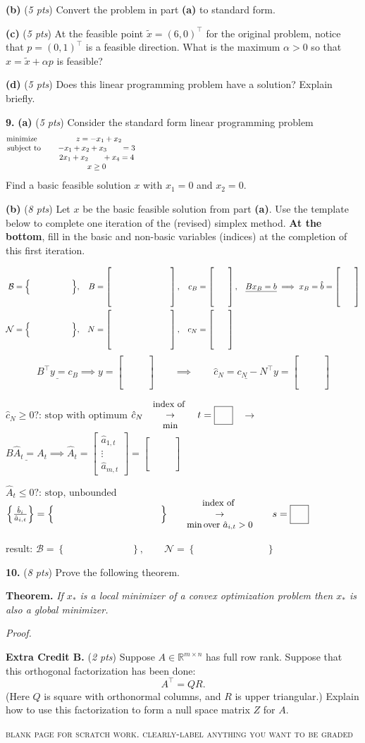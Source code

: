 \documentclass[11pt]{amsart}
\newcommand{\RR}{{\mathbb{R}}}
\newcommand{\prob}[1]{\bigskip\noindent\textbf{#1.} }
\newcommand{\pts}[1]{(\emph{#1 pts})}
\newcommand{\probpts}[2]{\prob{#1} \pts{#2}}
\newcommand{\ppartpts}[2]{\textbf{(#1)} \pts{#2}}
\newcommand{\epartpts}[2]{\medskip\noindent \textbf{(#1)} \pts{#2}}
\newcommand{\blankset}{\Big\{\hspace{0.7in}\Big\}}
\newcommand{\blankmatrix}{\begin{bmatrix} \hspace{1.0in} \\ \hspace{1.0in} \\ \hspace{1.0in} \\ \hspace{1.0in} \end{bmatrix}}
\newcommand{\blankcolumn}{\begin{bmatrix} \phantom{mm} \\ \phantom{m} \\ \phantom{m} \\ \phantom{m} \end{bmatrix}}
\newcommand{\boxint}{\boxed{\phantom{m\big|}}}
\newcommand{\longblankset}{\Big\{\hspace{1.5in}\Big\}}
\newcommand{\stacksarrow}[2]{\quad {\small \begin{matrix} #1 \\ \to \\ #2 \end{matrix}} \quad}
\newcommand{\lpstep}{%
\noindent\hrulefill
\small
\begin{align*}
\mathcal{B} &= \blankset, & B &= \blankmatrix, & c_B &= \blankcolumn, & \underline{B x_B = b} \implies x_B = \hat b &= \blankcolumn \\
\mathcal{N} &= \blankset, & N &= \blankmatrix, & c_N &= \blankcolumn
\end{align*}
$$\underline{B^\top y = c_B} \implies y = \blankcolumn \qquad \implies \qquad \underline{\hat c_N = c_N - N^\top y} = \blankcolumn$$

\noindent $\boxed{\hat c_N \ge 0 \text{?: stop with optimum}}$ \quad $\hat c_N \stacksarrow{\text{index of }}{\min} t = \boxint$ \, $\to$ \, $\underline{B \hat A_t = A_t} \implies \hat A_t = \begin{bmatrix} \hat a_{1,t} \\ \vdots \\ \hat a_{m,t} \end{bmatrix} = \blankcolumn$

\medskip
\noindent $\boxed{\hat A_t \le 0 \text{?: stop, unbounded}}$ \quad $\Big\{\frac{\hat b_i}{\hat a_{i,t}}\Big\} = \longblankset \quad \stacksarrow{\text{index of }}{\min \text{over } \hat a_{i,t}>0} \quad s = \boxint$}
\begin{document}
\epartpts{b}{5}  Convert the problem in part \textbf{(a)} to standard form.
\vfill

\epartpts{c}{5}  At the feasible point $\tilde x = (6,0)^\top$ for the original problem, notice that $p=(0,1)^\top$ is a feasible direction.  What is the maximum $\alpha>0$ so that $x=\tilde x + \alpha p$ is feasible?
\vfill

\epartpts{d}{5}  Does this linear programming problem have a solution?  Explain briefly.
\vfill



\clearpage\newpage
\prob{9} \ppartpts{a}{5}  Consider the standard form linear programming problem
    $$\begin{matrix}
    \text{minimize}\phantom{xxx} & \phantom{x}z = -x_1 + x_2 \\
    \text{subject to}\phantom{xx} & -x_1 + x_2 + x_3 \phantom{+x_4} = 3 \\
                      & 2 x_1 + x_2 \phantom{+x_3} + x_4= 4 \\
                      & x \ge 0
    \end{matrix} \hspace{4.0in}$$
Find a basic feasible solution $x$ with $x_1=0$ and $x_2=0$.
\vspace{1.25in}

\epartpts{b}{8}  Let $x$ be the basic feasible solution from part \textbf{(a)}.  Use the template below to complete one iteration of the (revised) simplex method.  \textbf{At the bottom}, fill in the basic and non-basic variables (indices) at the completion of this first iteration.

\bigskip

\lpstep

\hrulefill

\bigskip\bigskip
\normalsize
\noindent  result: \hspace{0.5in} $\displaystyle \mathcal{B} = \left\{\phantom{\big| adlsadf a adkjf}\right\}, \qquad \mathcal{N} = \left\{\phantom{\big| ada da fdsdf lkjf}\right\}$


\clearpage\newpage
\probpts{10}{8}  Prove the following theorem.

\medskip
\noindent \textbf{Theorem.}  \emph{If $x_*$ is a local minimizer of a convex optimization problem then $x_*$ is also a global minimizer.}

\medskip
\noindent \emph{Proof.}
\vfill

\probpts{Extra Credit B}{2}  Suppose $A\in\RR^{m\times n}$ has full row rank.  Suppose that this orthogonal factorization has been done:
	$$A^\top = QR.$$
(Here $Q$ is square with orthonormal columns, and $R$ is upper triangular.)  Explain how to use this factorization to form a null space matrix $Z$ for $A$.
\vspace{1.5in}

\newpage
\bigskip
\small
\begin{center}
\textsc{blank page for scratch work.  clearly-label anything you want to be graded}
\end{center}
\vfill
\end{document}

